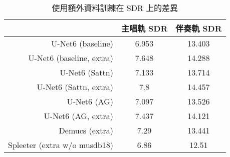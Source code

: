\begin{table}[htbp]
\centering
\begin{tabular}{|r|c|c|}
\hline
 & 主唱軌 SDR & 伴奏軌 SDR \\ \hline
U-Net6 (baseline) & 6.953 & 13.403 \\ \hline
U-Net6 (baseline, extra) & 7.648 & 14.288 \\ \hline
U-Net6 (Sattn) & 7.133 & 13.714 \\ \hline
U-Net6 (Sattn, extra) & 7.8 & 14.457 \\ \hline
U-Net6 (AG) & 7.097 & 13.526 \\ \hline
U-Net6 (AG, extra) & 7.437 & 14.121 \\ \hline
Demucs (extra) & 7.29 & 13.441 \\ \hline
Spleeter (extra w/o musdb18) & 6.86 & 12.51 \\ \hline
\end{tabular}
\caption{使用額外資料訓練在 SDR 上的差異}
\label{tab:whether_additional_data}
\end{table}